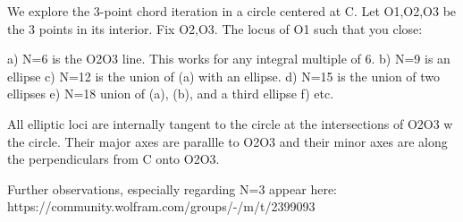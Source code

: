 We explore the 3-point chord iteration in a circle centered at C. Let O1,O2,O3 be the 3 points in its interior. Fix O2,O3. The locus of O1 such that you close:

a) N=6 is the O2O3 line. This works for any integral multiple of 6.
b) N=9 is an ellipse 
c) N=12 is the union of (a) with an ellipse.
d) N=15 is the union of two ellipses
e) N=18 union of (a), (b), and a third ellipse
f) etc.

All elliptic loci are internally tangent to the circle at the intersections of O2O3 w the circle. Their major axes are parallle to O2O3 and their minor axes are along the perpendiculars from C onto O2O3.

Further observations, especially regarding N=3 appear here: https://community.wolfram.com/groups/-/m/t/2399093
